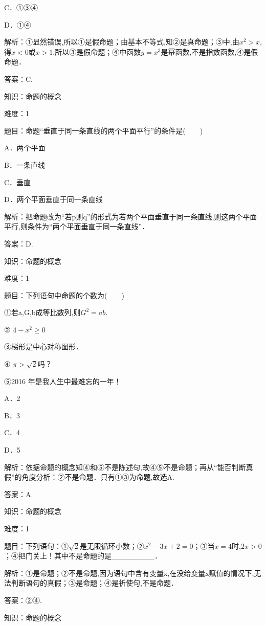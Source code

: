 \documentclass{article} %
\begin{document}
C．①③④   

D．①④

解析：①显然错误,所以①是假命题；由基本不等式,知②是真命题；③中,由$x^{2}>x$,得$x<0$或$x>1$,所以③是假命题；④中函数$y=x^{3}$是幂函数,不是指数函数,④是假命题．

答案：C.



知识：命题的概念

难度：1

题目：命题``垂直于同一条直线的两个平面平行''的条件是(　　)

A．两个平面

B．一条直线

C．垂直

D．两个平面垂直于同一条直线

解析：把命题改为``若p则q''的形式为若两个平面垂直于同一条直线,则这两个平面平行,则条件为``两个平面垂直于同一条直线''．

答案：D.



知识：命题的概念

难度：1

题目：下列语句中命题的个数为(　　)

①若a,G,b成等比数列,则$G^{2}=ab$.

② $4-x^2\ge 0$

③梯形是中心对称图形．

④ $\pi > \sqrt{2}$吗？

⑤2016 年是我人生中最难忘的一年！

A．2　　　　

B．3　　　　

C．4　　　　

D．5

解析：依据命题的概念知④和⑤不是陈述句,故④⑤不是命题；再从``能否判断真假''的角度分析：②不是命题．只有①③为命题,故选A.

答案：A.



知识：命题的概念

难度：1

题目：下列语句：①$\sqrt{2}$是无限循环小数；②$x^2-3x+2=0$；③当$x=4$时,$2x>0$；④把门关上！其中不是命题的是\_\_\_\_\_\_\_\_．

解析：①是命题；②不是命题,因为语句中含有变量x,在没给变量x赋值的情况下,无法判断语句的真假；③是命题；④是祈使句,不是命题．

答案：②④.



知识：命题的概念
\end{document}

